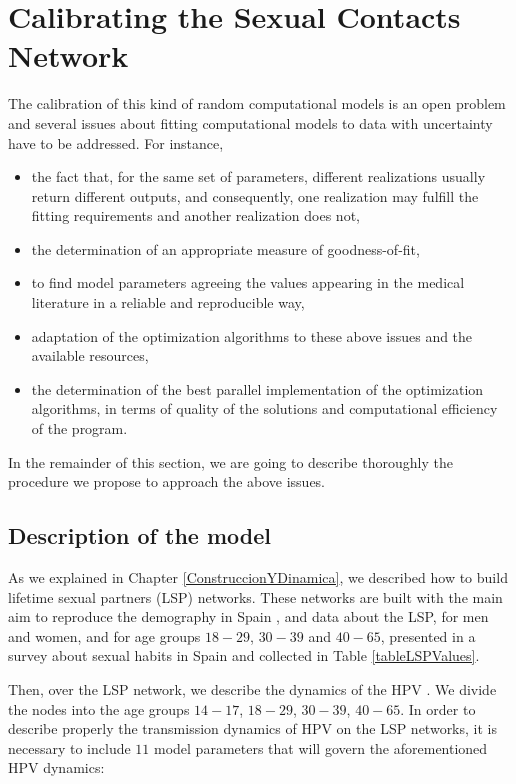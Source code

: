 \chapter{Calibrating the Sexual Contacts Network }\label{Calibrado}

The calibration of this kind of random computational models is an open problem and several issues about fitting computational models to data with uncertainty have to be addressed. For instance, 

\begin{itemize}
	\item the fact that, for the same set of parameters, different realizations usually return different outputs, and consequently, one realization may fulfill the fitting requirements and another realization does not,
	\item the determination of an appropriate measure of goodness-of-fit,
	\item to find model parameters agreeing the values appearing in the medical literature in a reliable and reproducible way,
	\item adaptation of the optimization algorithms to these above issues and the available resources,
	\item the determination of the best parallel implementation of the optimization algorithms, in terms of quality of the solutions and computational efficiency of the program.
\end{itemize} 

In the remainder of this section, we are going to describe thoroughly the procedure we propose to approach the above issues.

\section{Description of the model}\label{sec:modelo}
As we explained in Chapter \ref{ConstruccionYDinamica}, we described how to build lifetime sexual partners (LSP) networks. These networks are built with the main aim to reproduce the demography in Spain \cite{IVE}, and data about the LSP, for men and women, and for age groups $18-29$, $30-39$ and $40-65$, presented in a survey about sexual habits in Spain \cite{INE} and collected in Table \ref{tableLSPValues}. 

Then, over the LSP network, we describe the dynamics of the HPV \cite{Acedo2017,DezDomingo2017}. We divide the nodes into the age groups $14-17$, $18-29$, $30-39$, $40-65$. In order to describe properly the transmission dynamics of HPV on the LSP networks, it is necessary to include $11$ model parameters that will govern the aforementioned HPV dynamics:

